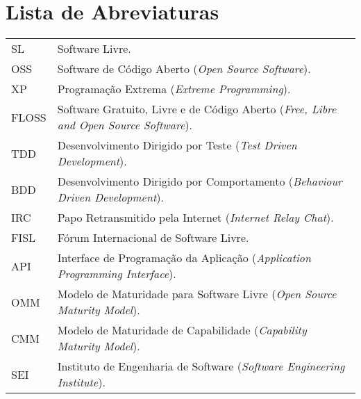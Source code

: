 \documentclass[11pt,twoside,a4paper]{book}
\begin{document}
\chapter{Lista de Abreviaturas}
\begin{tabular}{ll}
  SL       & Software Livre.\\
  OSS         & Software de Código Aberto (\emph{Open Source
    Software}).\\
  XP       & Programação Extrema (\emph{Extreme Programming}).\\
  FLOSS       & Software Gratuito, Livre e de Código Aberto
  (\emph{Free, Libre and Open Source Software}).\\
  TDD       & Desenvolvimento Dirigido por Teste
  (\emph{Test Driven Development}).\\
  BDD       & Desenvolvimento Dirigido por Comportamento
  (\emph{Behaviour Driven Development}).\\
  IRC       & Papo Retransmitido pela Internet (\emph{Internet Relay
    Chat}).\\
  FISL       & Fórum Internacional de Software Livre.\\
  API       & Interface de Programação da Aplicação (\emph{Application
    Programming Interface}).\\
  OMM       & Modelo de Maturidade para Software Livre (\emph{Open
    Source Maturity Model}).\\
  CMM       & Modelo de Maturidade de Capabilidade (\emph{Capability
    Maturity Model}).\\
  SEI       & Instituto de Engenharia de Software (\emph{Software
    Engineering Institute}).\\
\end{tabular}


\listoffigures %

\mainmatter
\fancyhead[RE,LO]{\thesection}

\onehalfspacing %
\end{document}
